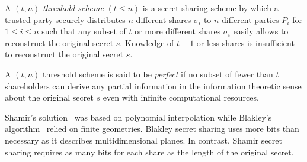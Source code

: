 \begin{defn}
\label{def:threshold_scheme}
 A $\left( t, n \right)$ \textit{threshold scheme} $\left( t \leq n \right)$ is a secret sharing scheme by which a trusted party securely distributes $n$ different shares $\sigma_i$ to $n$ different parties $P_i$ for $1 \leq i \leq n$ such that any subset of $t$ or more different shares $\sigma_i$ easily allows to reconstruct the original secret $s$. Knowledge of $t-1$ or less shares is insufficient to reconstruct the original secret $s$.
\end{defn}

\begin{defn}
\label{def:threshold_scheme}
 A $\left( t, n \right)$ threshold scheme is said to be \textit{perfect} if no subset of fewer than $t$ shareholders can derive any partial information in the information theoretic sense about the original secret $s$ even with infinite computational resources.
\end{defn}

Shamir's solution~\cite{art:Shamir79} was based on polynomial interpolation while Blakley's algorithm~\cite{art:Blakley79} relied on finite geometries. Blakley secret sharing uses more bits than necessary as it describes multidimensional planes. In contrast, Shamir secret sharing requires as many bits for each share as the length of the original secret.


